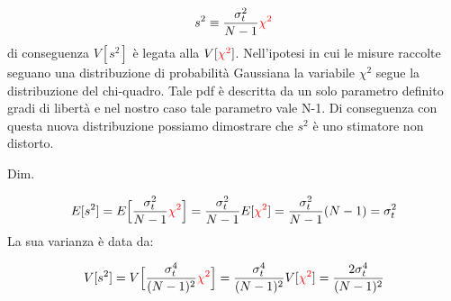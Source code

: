 \begin{equation*}
	s^2 \equiv \dfrac{\sigma_t^2}{N-1}\textcolor{red}{\chi^2}
\end{equation*}
\newline
di conseguenza $V[s^2]$ \`{e} legata alla $V[\textcolor{red}{\chi^2}]$. Nell'ipotesi in cui le misure raccolte seguano una distribuzione di probabilit\`{a} Gaussiana la variabile $\chi^2$ segue la distribuzione del chi-quadro. Tale pdf \`{e} descritta da un solo parametro definito gradi di libert\`{a} e nel nostro caso tale parametro vale N-1. 
\newline
Di conseguenza con questa nuova distribuzione possiamo dimostrare che $s^2$ \`{e} uno stimatore non distorto.\newline

Dim.

\begin{equation*}
	E[s^2] = E \Big[\dfrac{\sigma_t^2}{N-1}\textcolor{red}{\chi^2} \Big] = \dfrac{\sigma_t^2}{N-1}E[\textcolor{red}{\chi^2}] = \dfrac{\sigma_t^2}{N-1}(N-1) = \sigma_t^2
\end{equation*}
\newline
La sua varianza \`{e} data da:

\begin{equation*}
	V[s^2] = V \Big [ \dfrac{\sigma_t^4}{(N-1)^2}\textcolor{red}{\chi^2} \Big] = \dfrac{\sigma_t^4}{(N-1)^2}V[\textcolor{red}{\chi^2}] = \dfrac{2\sigma_t^4}{(N-1)^2} 
	\end{equation*}



